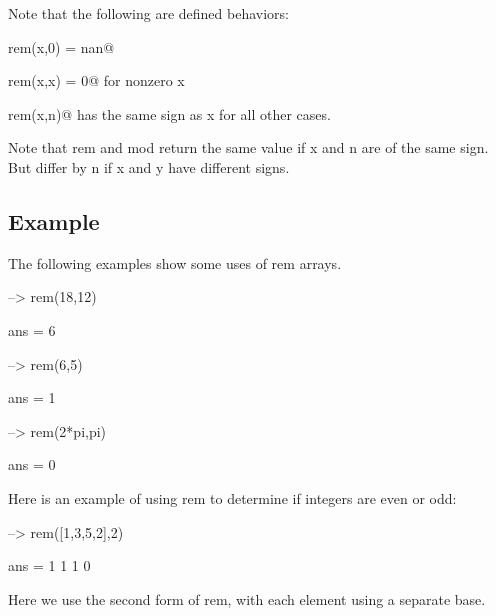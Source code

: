 Note that the following are defined behaviors\-: 
\begin{DoxyEnumerate}
\item {\ttfamily rem(x,0) = nan}@  
\item {\ttfamily rem(x,x) = 0}@ for nonzero {\ttfamily x}  
\item {\ttfamily rem(x,n)}@ has the same sign as {\ttfamily x} for all other cases.  
\end{DoxyEnumerate}Note that {\ttfamily rem} and {\ttfamily mod} return the same value if {\ttfamily x} and {\ttfamily n} are of the same sign. But differ by {\ttfamily n} if {\ttfamily x} and {\ttfamily y} have different signs. \hypertarget{variables_struct_Example}{}\subsection{Example}\label{variables_struct_Example}
The following examples show some uses of {\ttfamily rem} arrays.


\begin{DoxyVerbInclude}
--> rem(18,12)

ans = 
 6 

--> rem(6,5)

ans = 
 1 

--> rem(2*pi,pi)

ans = 
 0 
\end{DoxyVerbInclude}


Here is an example of using {\ttfamily rem} to determine if integers are even or odd\-:


\begin{DoxyVerbInclude}
--> rem([1,3,5,2],2)

ans = 
 1 1 1 0 
\end{DoxyVerbInclude}


Here we use the second form of {\ttfamily rem}, with each element using a separate base.


